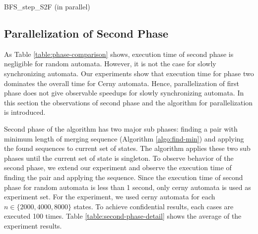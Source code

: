 \documentclass[12pt]{article}
\begin{document}
\begin{algorithm}[ht]
	\label{algo:BFS-step-S2F-Parallel}
	\caption{BFS\_step\_S2F (in parallel)}
	
	
		{
		}
\end{algorithm}


\subsection{Parallelization of Second Phase}
\label{sec:second-phase-parallelization}

As Table \ref{table:phase-comparison} shows, execution time of second phase is negligible for random automata. However, it is not the case for slowly synchronizing automata. Our experiments show that execution time for phase two dominates the overall time for Cerny automata. Hence, parallelization of first phase does not give observable speedups for slowly synchronizing automata. In this section the observations of second phase and the algorithm for parallelization is introduced.

Second phase of the algorithm has two major sub phases: finding a pair with minimum length of merging sequence (Algorithm \ref{algo:find-min}) and applying the found sequences to current set of states. The algorithm applies these two sub phases until the current set of state is singleton. To observe behavior of the second phase, we extend our experiment and observe the execution time of finding the pair and applying the sequence. Since the execution time of second phase for random automata is less than 1 second, only cerny automata is used as experiment set. For the experiment, we used cerny automata for each $n \in \{2000, 4000, 8000\}$ states. To achieve confidential results, each cases are executed 100 times. Table \ref{table:second-phase-detail} shows the average of the experiment results.
\end{document}
